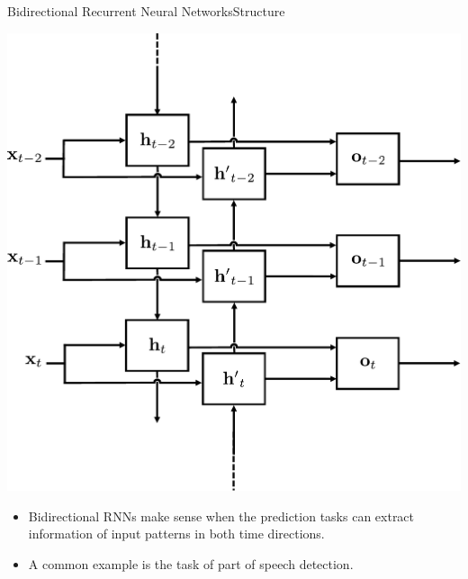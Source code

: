 \documentclass{beamer}
\begin{document}
\begin{frame}{Bidirectional Recurrent Neural Networks}{Structure}

\vspace{-0.5cm}

\begin{center}
\includegraphics[scale=0.3]{Module 5 (RNN)/pics/smaller_brnn_unrolled.pdf}
\end{center}

\begin{itemize}
\item Bidirectional RNNs make sense when the prediction tasks can extract information of input patterns in both time directions. 
\item A common example is the task of part of speech detection.
\end{itemize}
\begin{center}
\end{center}
\end{frame}
\end{document}
